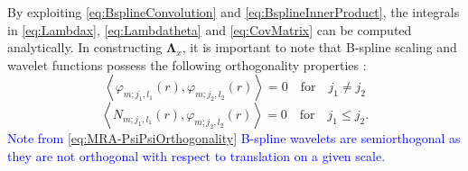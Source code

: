 \documentclass[review,authoryear,3p]{elsarticle}
\newcommand{\parham}[1]{\textcolor{blue}{#1}}
\begin{document}
By exploiting \eqref{eq:BsplineConvolution} and \eqref{eq:BsplineInnerProduct}, the integrals in \eqref{eq:Lambdax}, \eqref{eq:Lambdatheta} and \eqref{eq:CovMatrix} can be computed analytically. In constructing $\boldsymbol\Lambda_{x}$, it is important to note that B-spline scaling and wavelet functions possess the following orthogonality properties \citep{Unser1993}: 
\begin{equation}
  \left\langle \varphi_{m;j_1,l_1}(r),\varphi_{m;j_2,l_2}(r)\right\rangle =0  \quad \mathrm{for} \quad j_1\neq j_2
 \label{eq:MRA-PsiPsiOrthogonality} 
 \end{equation}
 \begin{equation}
  \left\langle N_{m;j_1,l_1}(r),\varphi_{m;j_2,l_2}(r)\right\rangle =0  \quad \mathrm{for} \quad j_1\leq j_2.
 \label{eq:MRA-PhiPsiOrthogonality}
 \end{equation}
  \parham{Note from \eqref{eq:MRA-PsiPsiOrthogonality} B-spline wavelets are semiorthogonal as they are not orthogonal with respect to translation on a given scale.} 
\end{document}
